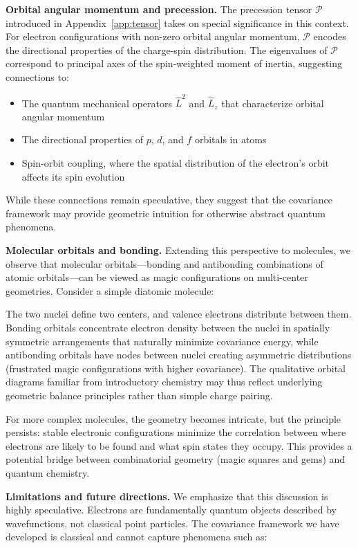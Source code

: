 \textbf{Orbital angular momentum and precession.} The precession tensor $\mathcal{P}$ introduced in Appendix~\ref{app:tensor} takes on special significance in this context. For electron configurations with non-zero orbital angular momentum, $\mathcal{P}$ encodes the directional properties of the charge-spin distribution. The eigenvalues of $\mathcal{P}$ correspond to principal axes of the spin-weighted moment of inertia, suggesting connections to:

\begin{itemize}
\item The quantum mechanical operators $\hat{L}^2$ and $\hat{L}_z$ that characterize orbital angular momentum
\item The directional properties of $p$, $d$, and $f$ orbitals in atoms
\item Spin-orbit coupling, where the spatial distribution of the electron's orbit affects its spin evolution
\end{itemize}

While these connections remain speculative, they suggest that the covariance framework may provide geometric intuition for otherwise abstract quantum phenomena.

\textbf{Molecular orbitals and bonding.} Extending this perspective to molecules, we observe that molecular orbitals---bonding and antibonding combinations of atomic orbitals---can be viewed as magic configurations on multi-center geometries. Consider a simple diatomic molecule:

The two nuclei define two centers, and valence electrons distribute between them. Bonding orbitals concentrate electron density between the nuclei in spatially symmetric arrangements that naturally minimize covariance energy, while antibonding orbitals have nodes between nuclei creating asymmetric distributions (frustrated magic configurations with higher covariance). The qualitative orbital diagrams familiar from introductory chemistry may thus reflect underlying geometric balance principles rather than simple charge pairing.

For more complex molecules, the geometry becomes intricate, but the principle persists: stable electronic configurations minimize the correlation between where electrons are likely to be found and what spin states they occupy. This provides a potential bridge between combinatorial geometry (magic squares and gems) and quantum chemistry.

\textbf{Limitations and future directions.} We emphasize that this discussion is highly speculative. Electrons are fundamentally quantum objects described by wavefunctions, not classical point particles. The covariance framework we have developed is classical and cannot capture phenomena such as:

